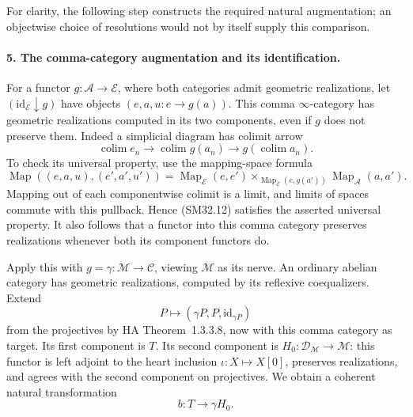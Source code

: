 \documentclass[11pt,a4paper]{article}
\theoremstyle{definition}\newtheorem{definition}[theorem]{Definition}
\theoremstyle{remark}\newtheorem{remark}[theorem]{Remark}
\begin{document}
For clarity, the following step constructs the required natural
augmentation; an objectwise choice of resolutions would not
by itself supply this comparison.

\paragraph{5. The comma-category augmentation and its identification.}
For a functor \(g:\mathcal A\to\mathcal E\), where both
categories admit geometric realizations, let
\((\mathrm{id}_{\mathcal E}\downarrow g)\) have objects
\((e,a,u:e\to g(a))\).  This comma \(\infty\)-category has
geometric realizations computed in its two components, even
if \(g\) does not preserve them.  Indeed a simplicial diagram
has colimit arrow
\[
 \operatorname*{colim}e_n\longrightarrow
 \operatorname*{colim}g(a_n)\longrightarrow
                                g(\operatorname*{colim}a_n).
                                                               \tag{SM32.12}
\]
To check its universal property, use the mapping-space formula
\[
 \operatorname{Map}((e,a,u),(e',a',u'))
 =\operatorname{Map}_{\mathcal E}(e,e')
  \mathop{\times}_{\operatorname{Map}_{\mathcal E}(e,g(a'))}
                 \operatorname{Map}_{\mathcal A}(a,a').        \tag{SM32.13}
\]
Mapping out of each componentwise colimit is a limit, and
limits of spaces commute with this pullback.  Hence (SM32.12)
satisfies the asserted universal property.  It also follows
that a functor into this comma category preserves realizations
whenever both its component functors do.

Apply this with \(g=\gamma:\mathcal M\to\mathcal C\),
viewing \(\mathcal M\) as its nerve.  An ordinary abelian
category has geometric realizations, computed by its reflexive
coequalizers.  Extend
\[
       P\longmapsto(\gamma P,P,\mathrm{id}_{\gamma P})
                                                               \tag{SM32.14}
\]
from the projectives by HA Theorem~1.3.3.8, now with this
comma category as target.  Its first component is \(T\).
Its second component is \(H_0:\mathcal D_{\mathcal M}
\to\mathcal M\): this functor is left adjoint to the heart
inclusion \(\iota:X\mapsto X[0]\), preserves realizations,
and agrees with the second component on projectives.
We obtain a coherent natural transformation
\[
                             b:T\longrightarrow\gamma H_0.  \tag{SM32.15}
\]
\end{document}
